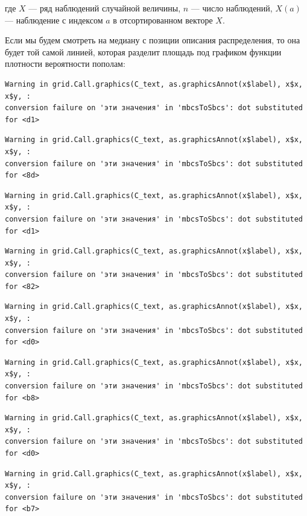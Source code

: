 \documentclass[
  letterpaper,
  DIV=11,
  numbers=noendperiod]{scrreprt}
\theoremstyle{definition}
\theoremstyle{remark}
\begin{document}
где \(X\) --- ряд наблюдений случайной величины, \(n\) --- число
наблюдений, \(X(a)\) --- наблюдение с индексом \(a\) в отсортированном
векторе \(X\).

Если мы будем смотреть на медиану с позиции описания распределения, то
она будет той самой линией, которая разделит площадь под графиком
функции плотности вероятности пополам:

\begin{verbatim}
Warning in grid.Call.graphics(C_text, as.graphicsAnnot(x$label), x$x, x$y, :
conversion failure on 'эти значения' in 'mbcsToSbcs': dot substituted for <d1>
\end{verbatim}

\begin{verbatim}
Warning in grid.Call.graphics(C_text, as.graphicsAnnot(x$label), x$x, x$y, :
conversion failure on 'эти значения' in 'mbcsToSbcs': dot substituted for <8d>
\end{verbatim}

\begin{verbatim}
Warning in grid.Call.graphics(C_text, as.graphicsAnnot(x$label), x$x, x$y, :
conversion failure on 'эти значения' in 'mbcsToSbcs': dot substituted for <d1>
\end{verbatim}

\begin{verbatim}
Warning in grid.Call.graphics(C_text, as.graphicsAnnot(x$label), x$x, x$y, :
conversion failure on 'эти значения' in 'mbcsToSbcs': dot substituted for <82>
\end{verbatim}

\begin{verbatim}
Warning in grid.Call.graphics(C_text, as.graphicsAnnot(x$label), x$x, x$y, :
conversion failure on 'эти значения' in 'mbcsToSbcs': dot substituted for <d0>
\end{verbatim}

\begin{verbatim}
Warning in grid.Call.graphics(C_text, as.graphicsAnnot(x$label), x$x, x$y, :
conversion failure on 'эти значения' in 'mbcsToSbcs': dot substituted for <b8>
\end{verbatim}

\begin{verbatim}
Warning in grid.Call.graphics(C_text, as.graphicsAnnot(x$label), x$x, x$y, :
conversion failure on 'эти значения' in 'mbcsToSbcs': dot substituted for <d0>
\end{verbatim}

\begin{verbatim}
Warning in grid.Call.graphics(C_text, as.graphicsAnnot(x$label), x$x, x$y, :
conversion failure on 'эти значения' in 'mbcsToSbcs': dot substituted for <b7>
\end{verbatim}
\end{document}
